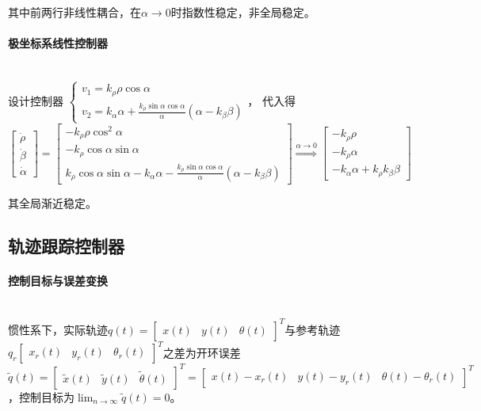 \documentclass[
12pt, %
a4paper, 
oneside, %
headinclude,footinclude, %
]{scrartcl}
\begin{document}
其中前两行非线性耦合，在$ \alpha \to 0 $时指数性稳定，非全局稳定。
\paragraph{极坐标系线性控制器}~\\

设计控制器%
$
\begin{cases}
v_1 = k_\rho \rho \cos\alpha \\
v_2 = k_\alpha \alpha + \frac{k_\rho \sin \alpha \cos\alpha}{\alpha}(\alpha - k_\beta\beta)
\end{cases}
$，%
代入得
$$ 
\begin{bmatrix} \dot{\rho} \\ \dot{\beta} \\ \dot{\alpha} \end{bmatrix} 
= \begin{bmatrix} -k_\rho \rho \cos^2\alpha \\ -k_\rho \cos\alpha \sin\alpha \\ k_\rho \cos\alpha \sin\alpha - k_\alpha \alpha - \frac{k_\rho \sin\alpha \cos\alpha}{\alpha} (\alpha - k_\beta\beta) \end{bmatrix} 
\overset{\alpha \to 0}{\Longrightarrow}
\begin{bmatrix} -k_\rho \rho \\ -k_\rho \alpha \\ - k_\alpha \alpha + k_\rho k_\beta\beta \end{bmatrix} 
$$

其全局渐近稳定。
\subsection[轨迹跟踪控制器]{轨迹跟踪控制器}
\paragraph{控制目标与误差变换}~\\

惯性系下，实际轨迹$ q(t) = \begin{bmatrix} x(t) & y(t) & \theta(t) \end{bmatrix}^T $与参考轨迹$ q_r \begin{bmatrix} x_r(t) & y_r(t) & \theta_r(t) \end{bmatrix}^T $之差为开环误差$ \tilde{q}(t) = \begin{bmatrix} \tilde{x}(t) & \tilde{y}(t) & \tilde{\theta}(t) \end{bmatrix}^T = \begin{bmatrix} x(t) - x_r(t) & y(t) - y_r(t) & \theta(t) - \theta_r(t) \end{bmatrix}^T $，控制目标为$ \lim_{n \to \infty} \tilde{q}(t) = 0 $。
\end{document}
